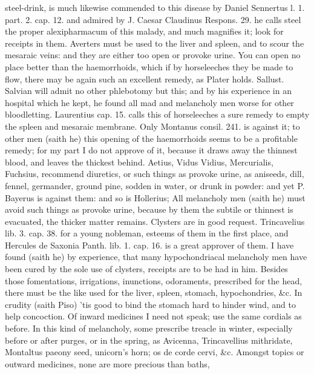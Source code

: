 steel-drink, is much likewise commended to this disease by Daniel
Sennertus l. 1. part. 2. cap. 12. and admired by J. Caesar Claudinus
Respons. 29. he calls steel the proper alexipharmacum of this
malady, and much magnifies it; look for receipts in them. Averters must
be used to the liver and spleen, and to scour the mesaraic veins: and
they are either too open or provoke urine. You can open no place better
than the haemorrhoids, which if by horseleeches they be made to flow,
there may be again such an excellent remedy, as Plater holds.
Sallust. Salvian will admit no other phlebotomy but this; and by his
experience in an hospital which he kept, he found all mad and
melancholy men worse for other bloodletting. Laurentius cap. 15. calls
this of horseleeches a sure remedy to empty the spleen and mesaraic
membrane. Only Montanus consil. 241. is against it;  to other men
(saith he) this opening of the haemorrhoids seems to be a profitable
remedy; for my part I do not approve of it, because it draws away the
thinnest blood, and leaves the thickest behind.
Aetius, Vidus Vidius, Mercurialis, Fuchsius, recommend diuretics, or
such things as provoke urine, as aniseeds, dill, fennel, germander,
ground pine, sodden in water, or drunk in powder: and yet P.
Bayerus is against them: and so is Hollerius; All melancholy men (saith
he) must avoid such things as provoke urine, because by them the
subtile or thinnest is evacuated, the thicker matter remains.
Clysters are in good request. Trincavelius lib. 3. cap. 38. for a young
nobleman, esteems of them in the first place, and Hercules de Saxonia
Panth. lib. 1. cap. 16. is a great approver of them. I have found
(saith he) by experience, that many hypochondriacal melancholy men have
been cured by the sole use of clysters, receipts are to be had in him.
Besides those fomentations, irrigations, inunctions, odoraments,
prescribed for the head, there must be the like used for the liver,
spleen, stomach, hypochondries, \&c. In crudity (saith Piso) 'tis
good to bind the stomach hard to hinder wind, and to help concoction.
Of inward medicines I need not speak; use the same cordials as before.
In this kind of melancholy, some prescribe treacle in winter,
especially before or after purges, or in the spring, as Avicenna,
 Trincavellius mithridate, Montaltus paeony seed, unicorn's
horn; os de corde cervi, \&c.
Amongst topics or outward medicines, none are more precious than baths,

